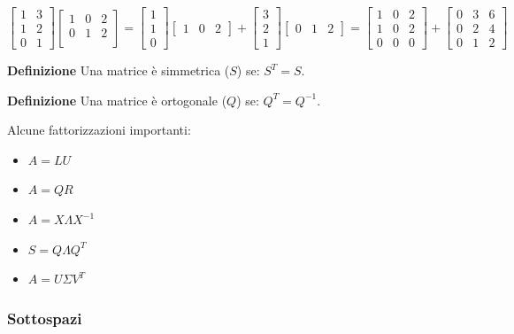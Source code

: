 \documentclass{article}
\newcommand{\df}{\noindent\textbf{Definizione} }
\begin{document}
\[
\begin{bmatrix}
    1 & 3\\ 
    1 & 2\\
    0 & 1 
\end{bmatrix}
\begin{bmatrix}
    1 & 0 & 2\\ 
    0 & 1 & 2\\
\end{bmatrix}
=
\begin{bmatrix}
1\\
1\\
0
\end{bmatrix}
\begin{bmatrix}
1 & 0 & 2
\end{bmatrix}
+
\begin{bmatrix}
3\\
2\\
1
\end{bmatrix}
\begin{bmatrix}
0 & 1 & 2
\end{bmatrix}
=
\begin{bmatrix}
1 & 0 & 2\\
1 & 0 & 2\\
0 & 0 & 0
\end{bmatrix}
+
\begin{bmatrix}
0 & 3 & 6\\
0 & 2 & 4\\
0 & 1 & 2
\end{bmatrix}
\]\newline

\df Una matrice è simmetrica ($S$) se: $S^T=S$.\newline

\df Una matrice è ortogonale ($Q$) se: $Q^T=Q^{-1}$.\newline

Alcune fattorizzazioni importanti:
\begin{itemize}
    \item $A=LU$
    \item $A=QR$
    \item $A=X\Lambda X^{-1}$
    \item $S=Q\Lambda Q^T$
    \item $A=U\Sigma V^T$
\end{itemize}\newpage

\subsubsection{Sottospazi}
\end{document}
